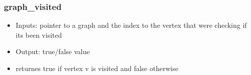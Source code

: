 \documentclass{article}
\begin{document}
\subsubsection{graph\_visited}
\begin{itemize}
    \item Inputs: pointer to a graph and the index to the vertex that were checking if its been visited
    \item Output: true/false value
    \item returnes true if vertex v is visited and false otherwise 
\end{itemize}


\end{document}
